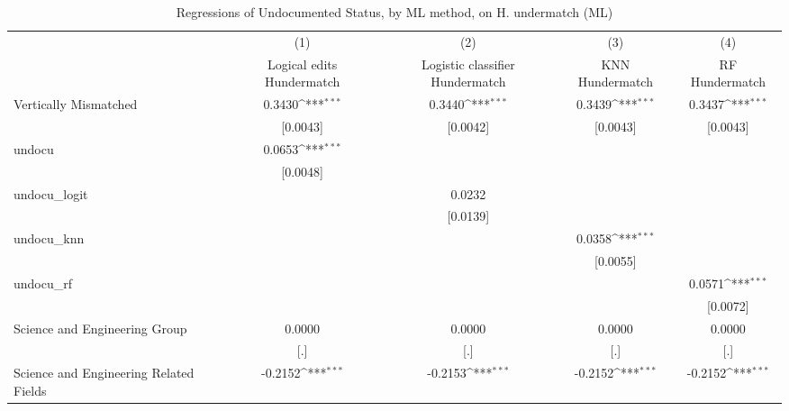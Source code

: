 \begin{table}[htbp]\centering
\def\sym#1{\ifmmode^{#1}\else\(^{#1}\)\fi}
\caption{Regressions of Undocumented Status, by ML method, on H. undermatch (ML)}
\begin{tabular}{l*{4}{c}}
\toprule
                    &\multicolumn{1}{c}{(1)}         &\multicolumn{1}{c}{(2)}         &\multicolumn{1}{c}{(3)}         &\multicolumn{1}{c}{(4)}         \\
                    &Logical edits Hundermatch         &Logistic classifier Hundermatch         &KNN Hundermatch         &RF Hundermatch         \\
\midrule
Vertically Mismatched&      0.3430\sym{***}&      0.3440\sym{***}&      0.3439\sym{***}&      0.3437\sym{***}\\
                    &    [0.0043]         &    [0.0042]         &    [0.0043]         &    [0.0043]         \\
\addlinespace
undocu              &      0.0653\sym{***}&                     &                     &                     \\
                    &    [0.0048]         &                     &                     &                     \\
\addlinespace
undocu\_logit        &                     &      0.0232         &                     &                     \\
                    &                     &    [0.0139]         &                     &                     \\
\addlinespace
undocu\_knn          &                     &                     &      0.0358\sym{***}&                     \\
                    &                     &                     &    [0.0055]         &                     \\
\addlinespace
undocu\_rf           &                     &                     &                     &      0.0571\sym{***}\\
                    &                     &                     &                     &    [0.0072]         \\
\addlinespace
Science and Engineering Group&      0.0000         &      0.0000         &      0.0000         &      0.0000         \\
                    &         [.]         &         [.]         &         [.]         &         [.]         \\
\addlinespace
Science and Engineering Related Fields&     -0.2152\sym{***}&     -0.2153\sym{***}&     -0.2152\sym{***}&     -0.2152\sym{***}\\

\end{tabular}
\end{table}
